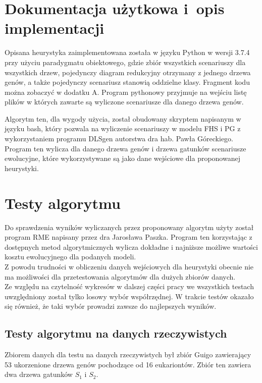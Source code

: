\documentclass[licencjacka]{pracamgr}
\begin{document}
\section{Dokumentacja użytkowa i~opis implementacji}\label{r:impl}
Opisana heurystyka zaimplementowana została w języku Python w wersji 3.7.4 przy użyciu paradygmatu obiektowego, gdzie zbiór wszystkich scenariuszy dla wszystkich drzew, pojedynczy diagram redukcyjny otrzymany z jednego drzewa genów, a także pojedynczy scenariusz stanowią oddzielne klasy. Fragment kodu można zobaczyć w dodatku A. Program pythonowy przyjmuje na wejściu listę plików w których zawarte są wyliczone scenariusze dla danego drzewa genów.

Algorytm ten, dla wygody użycia, został obudowany skryptem napisanym w języku bash, który pozwala na wyliczenie scenariuszy w modelu FHS i PG z wykorzystaniem programu DLSgen autorstwa dra hab. Pawła Góreckiego.\cite{dlsgen} Program ten wylicza dla danego drzewa genów i drzewa gatunków scenariusze ewolucyjne, które wykorzystywane są jako dane wejściowe dla proponowanej heurystyki.


\section{Testy algorytmu}
Do sprawdzenia wyników wyliczanych przez proponowany algorytm użyty został program RME napisany przez dra Jarosława Paszka. Program ten korzystając z dostępnych metod algorytmicznych wylicza dokładne i najniższe możliwe wartości kosztu ewolucyjnego dla podanych modeli. \cite{rme}
\\
Z powodu trudności w obliczeniu danych wejściowych dla heurystyki obecnie nie ma możliwości dla przetestowania algorytmów dla dużych zbiorów danych.
\\
Ze względu na czytelność wykresów w dalszej części pracy we wszystkich testach uwzględniony został tylko losowy wybór współrzędnej. W trakcie testów okazało się również, że taki wybór prowadzi zawsze do najlepszych wyników. 


\subsection{Testy algorytmu na danych rzeczywistych}
Zbiorem danych dla testu na danych rzeczywistych był zbiór Guigo zawierający 53 ukorzenione drzewa genów pochodzące od 16 eukariontów. Zbiór ten zawiera dwa drzewa gatunków $S_1$ i $S_2$. \cite{guigo}
\end{document}
